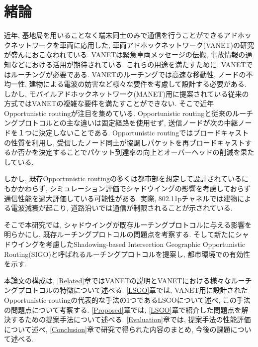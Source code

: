 \documentclass[10pt]{jreport}
\begin{document}
\newpage
\pagestyle{myheadings}
\renewcommand{\thepage}{\roman{page}}
\tableofcontents


\newpage
\renewcommand{\thepage}{\arabic{page}}
\setcounter{page}{1}
\chapter{緒論}
\vspace{-5mm}

近年, 基地局を用いることなく端末同士のみで通信を行うことができるアドホックネットワークを車両に応用した, 車両アドホックネットワーク(VANET)の研究が盛んにおこなわれている. VANETは緊急車両メッセージの伝搬, 事故情報の通知などにおける活用が期待されている. これらの用途を満たすために, VANETではルーチングが必要である. VANETのルーチングでは高速な移動性, ノードの不均一性, 建物による電波の妨害など様々な要件を考慮して設計する必要がある. しかし, モバイルアドホックネットワーク(MANET)用に提案されている従来の方式\cite {3,4,5}ではVANETの複雑な要件を満たすことができない. そこで近年Opportunistic routing\cite{16}が注目を集めている. Opportunistic routingと従来のルーチングプロトコルとの主な違いは固定経路を使用せず, 送信ノードが次の中継ノードを１つに決定しないことである. Opportunistic routingではブロードキャストの性質を利用し, 受信したノード同士が協調しパケットを再ブロードキャストするか否かを決定することでパケット到達率の向上とオーバーヘッドの削減を果たしている. 

しかし, 既存Opportunistic routingの多くは都市部を想定して設計されているにもかかわらず, シミュレーション評価でシャドウイングの影響を考慮しておらず通信性能を過大評価している可能性がある. 実際, 802.11pチャネルでは建物による電波減衰が起こり, 道路沿いでは通信が制限されることが示されている\cite{17}. 

そこで本研究では, シャドウイングが既存ルーチングプロトコルに与える影響を明らかにし, 既存ルーチングプロトコルの問題点を考察する.
そして新たにシャドウイングを考慮したShadowing-based Intersection Geographic Opportunistic Routing(SIGO)と呼ばれるルーチングプロトコルを提案し, 都市環境での有効性を示す. 

本論文の構成は, \ref{Related}章ではVANETの説明とVANETにおける様々なルーチングプロトコルの特徴について述べる. \ref{LSGO}章では, VANET用に設計されたOpportunistic routingの代表的な手法の1つであるLSGOについて述べ, この手法の問題点について考察する. \ref{Proposed}章では, \ref{LSGO}章で紹介した問題点を解決するための提案手法について述べる. \ref{Evaluation}章では, 提案手法の性能評価について述べ, \ref{Conclusion}章で研究で得られた内容のまとめ, 今後の課題について述べる. 
\end{document}
